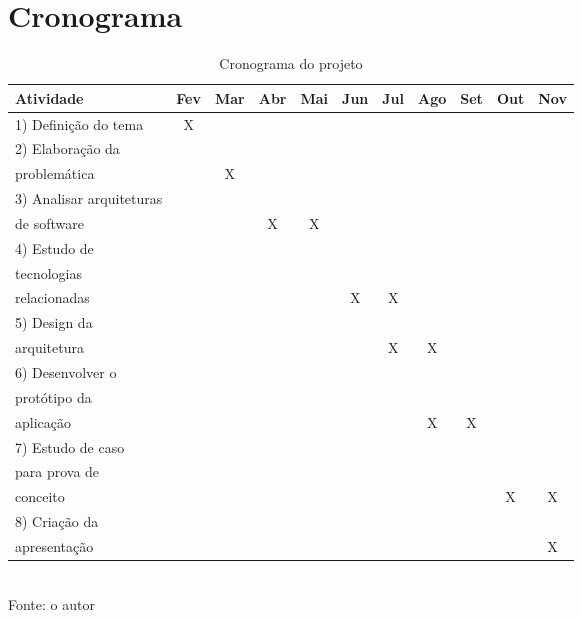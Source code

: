 \section{Cronograma}

\begin{table}[htbp]
\centering
\caption{Cronograma do projeto}
\label{tab:cronograma_projeto}
\begin{tabular}{|l|c|c|c|c|c|c|c|c|c|c|}
\hline
Atividade                    & Fev & Mar & Abr & Mai & Jun & Jul & Ago & Set & Out & Nov \\
\hline
1) Definição do tema         & X   &     &     &     &     &     &     &     &     & \\
\hline
2) Elaboração da             &     &     &     &     &     &     &     &     &     & \\
problemática                 &     & X   &     &     &     &     &     &     &     & \\
\hline
3) Analisar arquiteturas     &     &     &     &     &     &     &     &     &     & \\
de software                  &     &     & X   & X   &     &     &     &     &     & \\
\hline
4) Estudo de                 &     &     &     &     &     &     &     &     &     & \\
tecnologias                  &     &     &     &     &     &     &     &     &     & \\
relacionadas                 &     &     &     &     & X   & X   &     &     &     & \\
\hline
5) Design da                 &     &     &     &     &     &     &     &     &     & \\
arquitetura                  &     &     &     &     &     & X   & X   &     &     & \\
\hline
6) Desenvolver o             &     &     &     &     &     &     &     &     &     & \\
protótipo da                 &     &     &     &     &     &     &     &     &     & \\
aplicação                    &     &     &     &     &     &     & X   & X   &     & \\
\hline
7) Estudo de caso            &     &     &     &     &     &     &     &     &     & \\
para prova de                &     &     &     &     &     &     &     &     &     & \\
conceito                     &     &     &     &     &     &     &     &     & X   & X \\
\hline
8) Criação da                &     &     &     &     &     &     &     &     &     & \\
apresentação                 &     &     &     &     &     &     &     &     &     & X \\
\hline
\end{tabular}
\\ \footnotesize Fonte: o autor
\end{table}
